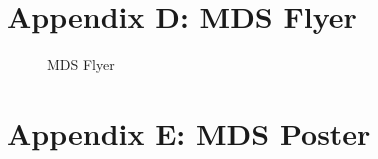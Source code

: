 \documentclass[
]{interact}
\begin{document}
\newpage{}

\section{Appendix D: MDS Flyer}\label{appendix-d-mds-flyer}

\begin{figure}


\caption{\label{fig-appendfig}MDS Flyer}

\end{figure}%

\newpage{}

\section{Appendix E: MDS Poster}\label{appendix-e-mds-poster}
\end{document}
